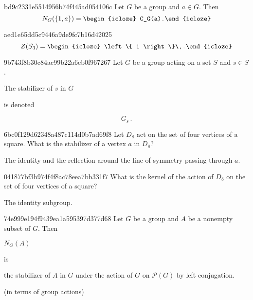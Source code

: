 \begin{note}{bd9c2331e5514956b74f445ad054106c}
    Let \({ G }\) be a group and \({ a \in G }\).
    Then
    \[
        N_G(\left\{ 1, a \right\}) = \begin{icloze}{1}C_G(a).\end{icloze}
    \]
\end{note}

\begin{note}{aed1e65dd5c9446a9de9fc7b16d42025}
    \[
        Z(S_3) = \begin{icloze}{1}\left\{ 1 \right\}\,.\end{icloze}
    \]
\end{note}

\begin{note}{9b743f8b30c84ac99b22a6eb0f967267}
    Let \({ G }\) be a group acting on a set \({ S }\) and \({ s \in S }\).
    \begin{icloze}{2}The stabilizer of \({ s }\) in \({ G }\)\end{icloze} is denoted
    \begin{icloze}{1}
        \[
            G_s\,.
        \]
    \end{icloze}
\end{note}

\begin{note}{6bc0f129d62348a487c114d0b7ad69f8}
    Let \({ D_8 }\) act on the set of four vertices of a square.
    What is the stabilizer of a vertex \({ a }\) in \({ D_8 }\)?

    \begin{cloze}{1}
        The identity and the reflection around the line of symmetry passing through \({ a }\).
    \end{cloze}
\end{note}

\begin{note}{041877bf3b974f4f8ac78eea7bb331f7}
    What is the kernel of the action of \({ D_8 }\) on the set of four vertices of a square?

    \begin{cloze}{1}
        The identity subgroup.
    \end{cloze}
\end{note}

\begin{note}{74e999e194f9439ea1a595397d377d68}
    Let \({ G }\) be a group and \({ A }\) be a nonempty subset of \({ G }\).
    Then \begin{icloze}{2}\({ N_G(A) }\)\end{icloze} is \begin{icloze}{1}the stabilizer of \({ A }\) in \({ G }\) under the action of \({ G }\) on \({ \mathcal P(G) }\) by left conjugation.\end{icloze}

    \begin{center}
        \tiny
        (in terms of group actions)
    \end{center}
\end{note}

